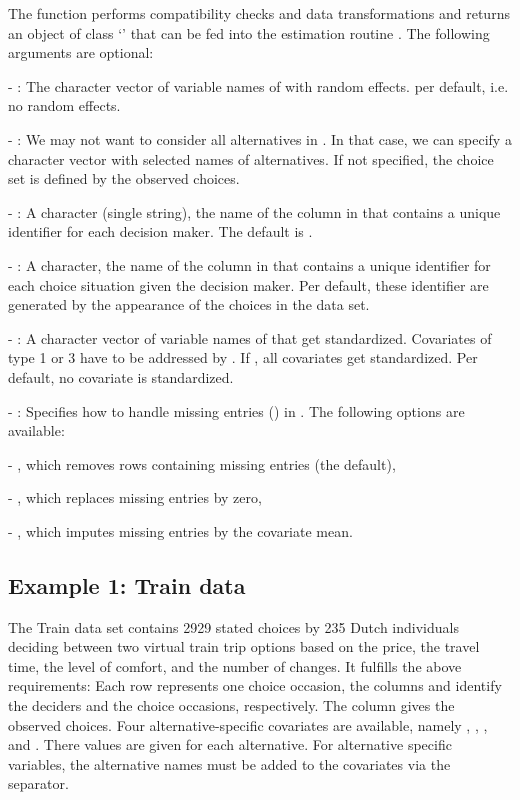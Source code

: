 \documentclass[article]{jss}
\newcommand{\class}[1]{`\code{#1}'}
\newcommand{\fct}[1]{\code{#1()}}
\begin{document}
The function performs compatibility checks and data transformations and returns an object of class \class{RprobitB\_data} that can be fed into the estimation routine \fct{mcmc}. The following arguments are optional:

- : The character vector of variable names of  with random effects.  per default, i.e. no random effects.

- : We may not want to consider all alternatives in . In that case, we can specify a character vector  with selected names of alternatives. If not specified, the choice set is defined by the observed choices.

- : A character (single string), the name of the column in  that contains a unique identifier for each decision maker. The default is .

- : A character, the name of the column in  that contains a unique identifier for each choice situation given the decision maker. Per default, these identifier are generated by the appearance of the choices in the data set.

- : A character vector of variable names of  that get standardized. Covariates of type 1 or 3 have to be addressed by . If , all covariates get standardized. Per default, no covariate is standardized.

- : Specifies how to handle missing entries () in . The following options are available:

  - , which removes rows containing missing entries (the default),

  - , which replaces missing entries by zero,

  - , which imputes missing entries by the covariate mean.

\subsection{Example 1: Train data} \label{subsec:train_data_prep}

The Train data set contains 2929 stated choices by 235 Dutch individuals deciding between two virtual train trip options based on the price, the travel time, the level of comfort, and the number of changes. It fulfills the above requirements: Each row represents one choice occasion, the columns  and  identify the deciders and the choice occasions, respectively. The column  gives the observed choices. Four alternative-specific covariates are available, namely , , , and . There values are given for each alternative. For alternative specific variables, the alternative names must be added to the covariates via the \code{\_} separator.
\end{document}
